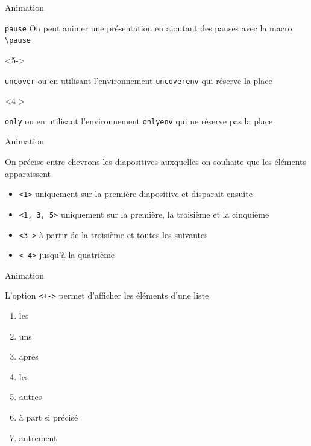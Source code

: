 \documentclass[french]{beamer}
\begin{document}
  \begin{frame}[fragile]{Animation}
    \begin{block}{\texttt{pause}}
      On peut animer une présentation \pause en ajoutant des pauses \pause avec la macro \verb:\pause: \pause
    \end{block}
    
    \begin{uncoverenv}<5->
    \begin{block}{\texttt{uncover}}
      ou en utilisant l'environnement \verb:uncoverenv: qui réserve la place
    \end{block}
    \end{uncoverenv}
    
    \begin{onlyenv}<4->
    \begin{block}{\texttt{only}}
      ou en utilisant l'environnement \verb:onlyenv: qui ne réserve pas la place
    \end{block}
    \end{onlyenv}
  \end{frame}
  
  \begin{frame}{Animation}
    \begin{remarque}
      On précise entre chevrons les diapositives auxquelles on souhaite que les éléments apparaissent
      \begin{itemize}
        \item<1> \texttt{<1>} uniquement sur la première diapositive et disparait ensuite
        \item<1, 3, 5> \texttt{<1, 3, 5>} uniquement sur la première, la troisième et la cinquième
        \item<3-> \texttt{<3->} à partir de la troisième et toutes les suivantes
        \item<-4> \texttt{<-4>} jusqu'à la quatrième
      \end{itemize}
    \end{remarque}
  \end{frame}
  
  \begin{frame}{Animation}
    \begin{remarque}
      L'option \texttt{<+->} permet d'afficher les éléments d'une liste
      \begin{enumerate}[<+->]
        \item les
        \item uns
        \item après
        \item les
        \item autres
        \item<1, 3, 5, 7> à part si précisé
        \item autrement
      \end{enumerate}
    \end{remarque}
  \end{frame}
  
\end{document}
